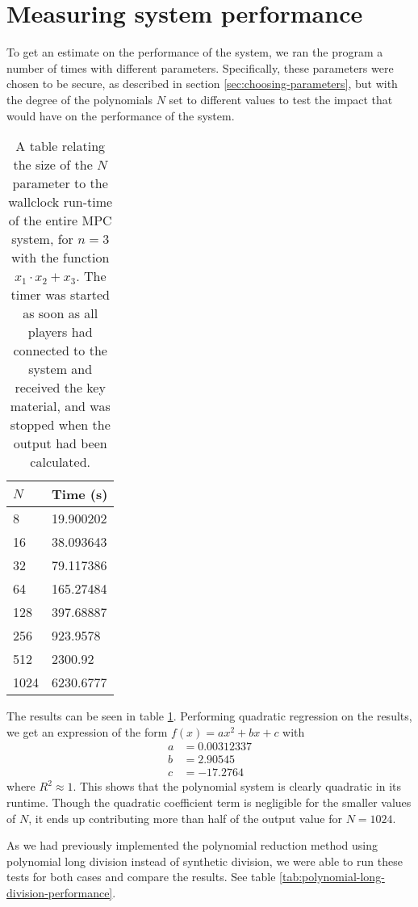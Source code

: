 \documentclass[../main.tex]{subfiles}
\begin{document}
\section{Measuring system performance}
To get an estimate on the performance of the system, we ran the program a number of times with different parameters. Specifically, these parameters were chosen to be secure, as described in section \ref{sec:choosing-parameters}, but with the degree of the polynomials $N$ set to different values to test the impact that would have on the performance of the system.

\begin{table}
    \centering
    \begin{tabular}{l|l}
        $N$  & Time (s)  \\
        \hline
        8    & 19.900202 \\
        16   & 38.093643 \\
        32   & 79.117386 \\
        64   & 165.27484 \\
        128  & 397.68887 \\
        256  & 923.9578  \\
        512  & 2300.92   \\
        1024 & 6230.6777
    \end{tabular}
    \caption{A table relating the size of the $N$ parameter to the wallclock run-time of the entire MPC system, for $n = 3$ with the function $x_1 \cdot x_2 + x_3$. The timer was started as soon as all players had connected to the system and received the key material, and was stopped when the output had been calculated.}
    \label{tab:synthetic-division-performance}
\end{table}

The results can be seen in table \ref{tab:synthetic-division-performance}. Performing quadratic regression on the results, we get an expression of the form $f(x) = a x^2 + b x + c$ with
\begin{align*}
    a & = 0.00312337 \\
    b & = 2.90545    \\
    c & = -17.2764
\end{align*}
where $R^2 \approx 1$. This shows that the polynomial system is clearly quadratic in its runtime. Though the quadratic coefficient term is negligible for the smaller values of $N$, it ends up contributing more than half of the output value for $N = 1024$.

As we had previously implemented the polynomial reduction method using polynomial long division instead of synthetic division, we were able to run these tests for both cases and compare the results. See table \ref{tab:polynomial-long-division-performance}.
\end{document}
